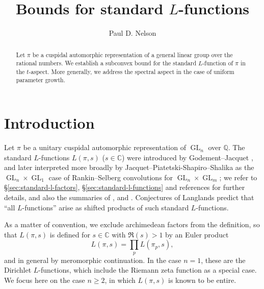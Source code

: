 \documentclass[reqno]{amsart}
\DeclareMathOperator{\GL}{GL}
\theoremstyle{plain} \newtheorem{theorem} {Theorem}
\theoremstyle{definition} \newtheorem{definition} [theorem] {Definition}
\theoremstyle{itplain} %
\numberwithin{equation}{section}
\numberwithin{theorem}{section}
\renewcommand{\geq}{\geqslant}
\begin{document}
\author{Paul D. Nelson}
\address{Aarhus University, Denmark}
\title{Bounds for standard $L$-functions}



\begin{abstract}
  Let $\pi$ be a cuspidal automorphic representation of a general linear group over the rational numbers.  We establish a subconvex bound for the standard $L$-function of $\pi$ in the $t$-aspect.  More generally, we address the spectral aspect in the case of uniform parameter growth.
\end{abstract}

\maketitle


\setcounter{tocdepth}{1} \tableofcontents

\section{Introduction}\label{sec:introduction}
Let $\pi$ be a unitary cuspidal automorphic representation of $\GL_n$ over $\mathbb{Q}$.  The standard $L$-functions $L(\pi,s)$ ($s \in \mathbb{C}$) were introduced by Godement--Jacquet \cite{MR0342495}, and later interpreted more broadly by Jacquet--Piatetski-Shapiro--Shalika as the $\GL_n \times \GL_1$ case of Rankin--Selberg convolutions for $\GL_n \times \GL_m$; we refer to \S\ref{sec:standard-l-factors}, \S\ref{sec:standard-l-functions} and references for further details, and also the summaries of \cite{MR546609}, \cite[\S2]{MR1395406} and \cite{MR2508768}.  Conjectures of Langlands \cite{MR0302614} predict that ``all $L$-functions'' arise as shifted products of such standard $L$-functions.

As a matter of convention, we exclude archimedean factors from the definition, so that $L(\pi,s)$ is defined for $s \in \mathbb{C}$ with $\Re(s) > 1$ \cite[I, Thm 5.3]{MR618323} by an Euler product
\begin{equation*}
  L(\pi,s) = \prod_p L(\pi_p,s),
\end{equation*}
and in general by meromorphic continuation.  In the case $n = 1$, these are the Dirichlet $L$-functions, which include the Riemann zeta function as a special case.  We focus here on the case $n \geq 2$, in which $L(\pi,s)$ is known to be entire.
\end{document}
